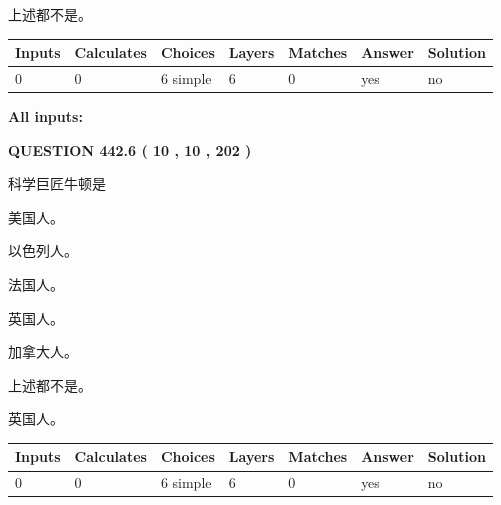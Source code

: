\documentclass{ctexart}
\begin{document}
 
 上述都不是。
 
 
\noindent{}
 
 
   
   
   
   
\noindent\begin{tabular}{|l|l|l|l|l|l|l|}
 \hline
Inputs & Calculates & Choices & Layers & Matches & Answer & Solution \\ \hline
 0  & 
 0  & 
 6
  simple  
  & 
 6  & 
 0  & 
  yes & 
  no 
  \\ \hline
 \end{tabular}
   
   
   
   
\noindent{}
   
   
   
   
\noindent\vspace{0.1in}\hspace{-0.08in} {\textbf{\Large{All inputs: }}}
   
   
  
\vspace{0.2in}
  
{\textbf{\Large{QUESTION
442.6 
 ( 10 , 10 , 202 )
}}}
  
  
科学巨匠牛顿是
 
 
美国人。
 
 
以色列人。
 
 
法国人。
 
 
英国人。
 
 
加拿大人。
 
 
 上述都不是。
 
 
\noindent{}
 
 
英国人。
 
 
\noindent{}
 
 
   
   
   
   
\noindent\begin{tabular}{|l|l|l|l|l|l|l|}
 \hline
Inputs & Calculates & Choices & Layers & Matches & Answer & Solution \\ \hline
 0  & 
 0  & 
 6
  simple  
  & 
 6  & 
 0  & 
  yes & 
  no 
  \\ \hline
 \end{tabular}
   
\end{document}
